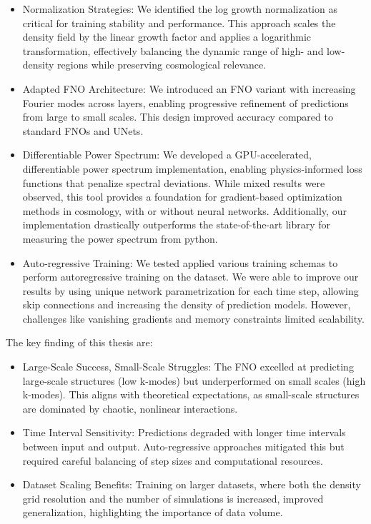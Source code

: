 \documentclass{article}
\begin{document}
{\begin{itemize}
    \item Normalization Strategies: We identified the log growth normalization as critical for training stability and performance. This approach scales the density field by the linear growth factor and applies a logarithmic transformation, effectively balancing the dynamic range of high- and low-density regions while preserving cosmological relevance.

    \item Adapted FNO Architecture: We introduced an FNO variant with increasing Fourier modes across layers, enabling progressive refinement of predictions from large to small scales. This design improved accuracy compared to standard FNOs and UNets.

    \item Differentiable Power Spectrum: We developed a GPU-accelerated, differentiable power spectrum implementation, enabling physics-informed loss functions that penalize spectral deviations. While mixed results were observed, this tool provides a foundation for gradient-based optimization methods in cosmology, with or without neural networks. Additionally, our implementation drastically outperforms the state-of-the-art library for measuring the power spectrum from python. 

    \item Auto-regressive Training: We tested applied various training schemas to perform autoregressive training on the dataset. We were able to improve our results by using unique network parametrization for each time step, allowing skip connections and increasing the density of prediction models. However, challenges like vanishing gradients and memory constraints limited scalability.
\end{itemize}

The key finding of this thesis are:

\begin{itemize}
    \item Large-Scale Success, Small-Scale Struggles: The FNO excelled at predicting large-scale structures (low k-modes) but underperformed on small scales (high k-modes). This aligns with theoretical expectations, as small-scale structures are dominated by chaotic, nonlinear interactions.
    \item  Time Interval Sensitivity: Predictions degraded with longer time intervals between input and output. Auto-regressive approaches mitigated this but required careful balancing of step sizes and computational resources.
    \item  Dataset Scaling Benefits: Training on larger datasets, where both the density grid resolution and the number of simulations is increased, improved generalization, highlighting the importance of data volume.
\end{itemize}

}
\end{document}

